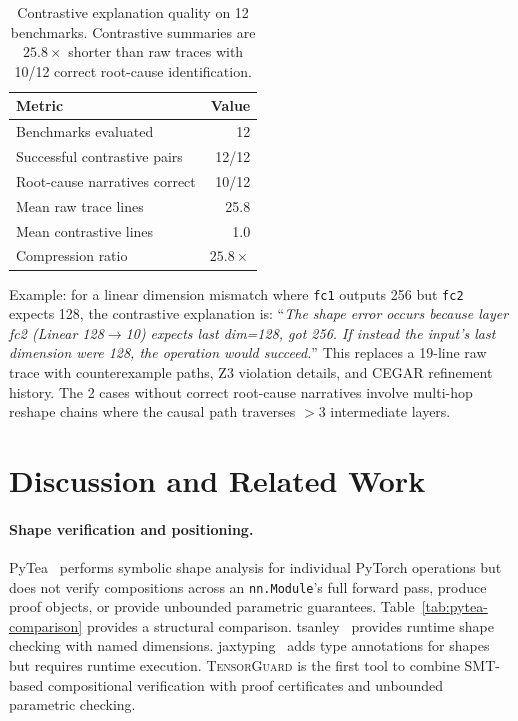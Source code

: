 \documentclass[11pt]{article}
\begin{document}
\begin{table}[h]
\centering
\caption{Contrastive explanation quality on 12 benchmarks.
  Contrastive summaries are $25.8\times$ shorter than raw traces
  with 10/12 correct root-cause identification.}
\label{tab:contrastive}
\small
\begin{tabular}{@{}lr@{}}
\toprule
\textbf{Metric} & \textbf{Value} \\
\midrule
Benchmarks evaluated         & 12 \\
Successful contrastive pairs & 12/12 \\
Root-cause narratives correct & 10/12 \\
Mean raw trace lines         & 25.8 \\
Mean contrastive lines       & 1.0 \\
Compression ratio            & $25.8\times$ \\
\bottomrule
\end{tabular}
\end{table}

Example: for a linear dimension mismatch where \texttt{fc1}
outputs 256 but \texttt{fc2} expects 128, the contrastive
explanation is: ``\emph{The shape error occurs because layer fc2
(Linear 128$\to$10) expects last dim=128, got 256.  If instead
the input's last dimension were 128, the operation would succeed.}''
This replaces a 19-line raw trace with counterexample paths,
Z3 violation details, and CEGAR refinement history.
The 2 cases without correct root-cause narratives involve
multi-hop reshape chains where the causal path traverses
$>3$ intermediate layers.


\section{Discussion and Related Work}\label{sec:discussion}\label{sec:discuss-limits}

\paragraph{Shape verification and positioning.}
PyTea~\cite{pytea} performs symbolic shape analysis for individual
PyTorch operations but does not verify compositions across an
\texttt{nn.Module}'s full forward pass, produce proof objects, or
provide unbounded parametric guarantees.
Table~\ref{tab:pytea-comparison} provides a structural comparison.
tsanley~\cite{tsanley} provides runtime shape checking with
named dimensions.  jaxtyping~\cite{jaxtyping} adds type annotations
for shapes but requires runtime execution.
\textsc{TensorGuard} is the first tool to combine SMT-based
compositional verification with proof certificates and unbounded
parametric checking.
\end{document}
